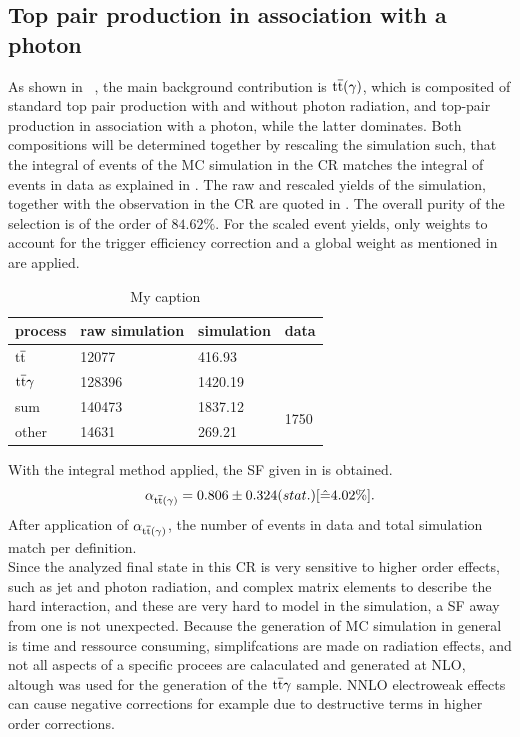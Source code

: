\subsection{Top pair production in association with a photon}\label{sec:ttbar}
As shown in ~, the main background contribution is ${\mathrm{t}\overline{\mathrm{t}}}(\gamma)$, which is composited of standard top pair production with and without photon radiation, and top-pair production in association with a photon, while the latter dominates. Both compositions will be determined together by rescaling the simulation such, that the integral of events of the MC simulation in the CR matches the integral of events in data as explained in . The raw and rescaled yields of the simulation, together with the observation in the CR are quoted in . The overall purity of the selection is of the order of $84.62\%$. For the scaled event yields, only weights to account for the trigger efficiency correction and a global weight as mentioned in  are applied.
\begin{table}[htb]
 \centering
 \caption{My caption}
 \label{tab:CRTT}
 \begin{tabular}{llll}
  
  process      & raw simulation & simulation & data                  \\\hline
  ${\mathrm{t}\overline{\mathrm{t}}}$     & 12077          & 416.93     &                       \\
  ${\mathrm{t}\overline{\mathrm{t}}}\gamma$ & 128396         & 1420.19    &                       \\\hline\hline
  sum          & 140473         & 1837.12    & \multirow{2}{*}{1750} \\
  other        & 14631          & 269.21     &                       
 \end{tabular}
\end{table}
With the integral method applied, the SF given in  is obtained.
\begin{equation}\label{eq:AlphaTT}
 \alpha_{{\mathrm{t}\overline{\mathrm{t}}}(\gamma)}=0.806 \pm 0.324 (stat.) [\hat{=}4.02\%].
\end{equation}
After application of $\alpha_{{\mathrm{t}\overline{\mathrm{t}}}(\gamma)}$, the number of events in data and total simulation match per definition.\\
Since the analyzed final state in this CR is very sensitive to higher order effects, such as jet and photon radiation, and complex matrix elements to describe the hard interaction, and these are very hard to model in the simulation, a SF away from one is not unexpected. Because the generation of MC simulation in general is time and ressource consuming, simplifcations are made on \eg radiation effects, and not all aspects of a specific procees are calaculated and generated at NLO, altough \AMCATNLO was used for the generation of the ${\mathrm{t}\overline{\mathrm{t}}}\gamma$ sample. NNLO electroweak effects can cause negative corrections for example due to destructive terms in higher order corrections.\\
